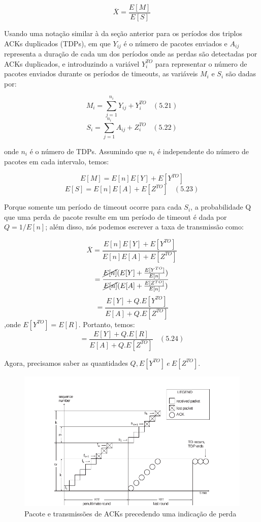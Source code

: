 $$\overline{X} = \frac{E[M]}{E[S]} $$

Usando uma notação similar à da seção anterior para os períodos dos triplos ACKs duplicados (TDPs), em que $Y_{ij}$ é o número de pacotes enviados e $A_{ij}$ representa a duração de cada um dos períodos onde as perdas são detectadas por ACKs duplicados, e introduzindo a variável $Y_i^{TO}$ para representar o número de pacotes enviados durante os períodos de timeouts, as variáveis $M_i$ e $S_i$ são dadas por:

$$M_i = \sum_{j=1}^{n_i}Y_{ij} + Y_i^{TO} \ \ \ \  (5.21)$$ 
$$S_i = \sum_{j=1}^{n_i}A_{ij} + Z_i^{TO} \ \ \ \  (5.22)$$ 

onde $n_i$ é o número de TDPs. Assumindo que $n_i$ é independente do número de pacotes em cada intervalo, temos:

$$E[M] = E[n]E[Y] + E[Y^{TO}] $$
$$E[S] = E[n]E[A] + E[Z^{TO}] \ \ \ \ (5.23)$$

Porque somente um período de timeout ocorre para cada $S_i$, a probabilidade Q que uma perda de pacote resulte em um período de timeout é dada por $Q = 1/E[n]$; além disso, nós podemos escrever a taxa de transmissão como:

$$\overline{X} = \frac{E[n]E[Y] + E[Y^{TO}]}{E[n]E[A] + E[Z^{TO}]} $$
$$= \frac{\cancel{E[n]}(E[Y] + \frac{E[Y^{TO}]}{E[n]})}{\cancel{E[n]}(E[A] + \frac{E[Z^{TO}]}{E[n]})} $$
$$= \frac{E[Y] + Q.E[Y^{TO}]}{E[A] + Q.E[Z^{TO}]} $$ ,onde $E[Y^{TO}] = E[R]$. Portanto, temos:
$$= \frac{E[Y] + Q.E[R]}{E[A] + Q.E[Z^{TO}]} \ \ \ \ (5.24)$$

Agora, precisamos saber as quantidades $Q, E[Y^{TO}] \  e \ E[Z^{TO}]$.

\begin{figure}
\begin{center}
\includegraphics[scale=1.0]{figs/timeout2.pdf} 
\caption{Pacote e transmissões de ACKs precedendo uma indicação de perda}
\label{fig4}
\end{center}
\end{figure}

